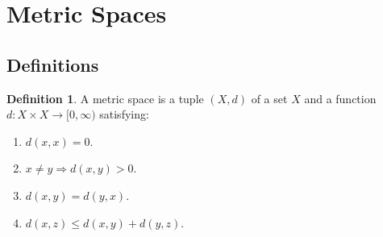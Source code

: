 \documentclass{article}
\theoremstyle{definition}
\newtheorem{defn}{Definition}[subsubsection]
\begin{document}
\section{Metric Spaces}
\subsection{Definitions}
\begin{defn}
	A metric space is a tuple $(X,d)$ of a set $X$ and a function $d:X\times X\rightarrow[0,\infty)$ satisfying:
	\begin{enumerate}
		\item $d(x,x)=0$.
		\item $x\not=y\Rightarrow d(x,y)>0$.
		\item $d(x,y)=d(y,x)$.
		\item $d(x,z)\leq d(x,y)+d(y,z)$.
	\end{enumerate}
\end{defn}
\end{document}
